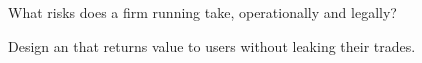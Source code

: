 \begin{interviewq}\label{iq:m3:maximal-extractable-value:5}
What risks does a firm running  take, operationally and legally?
\end{interviewq}

\begin{interviewq}\label{iq:m3:maximal-extractable-value:6}
Design an  that returns value to users without leaking their trades.
\end{interviewq}

